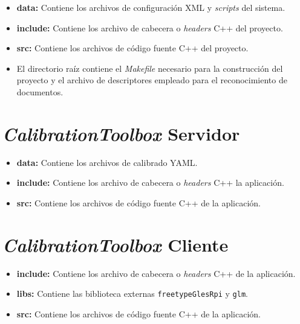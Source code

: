 \begin{itemize}
\item \textbf{data:} Contiene los archivos de configuración \acs{XML} y \textit{scripts} del sistema.
\item \textbf{include:} Contiene los archivo de cabecera o \textit{headers} C++ del proyecto.
\item \textbf{src:} Contiene los archivos de código fuente C++ del proyecto.
\item El directorio raíz contiene el \textit{Makefile} necesario para la construcción del proyecto y
  el archivo de descriptores empleado para el reconocimiento de documentos.
\end{itemize}

\section{\textit{CalibrationToolbox} Servidor}
\begin{itemize}
\item \textbf{data:} Contiene los archivos de calibrado YAML. 
\item \textbf{include:} Contiene los archivo de cabecera o \textit{headers} C++ la aplicación.
\item \textbf{src:} Contiene los archivos de código fuente C++ de la aplicación.
\end{itemize}

\section{\textit{CalibrationToolbox} Cliente}
\begin{itemize}
\item \textbf{include:} Contiene los archivo de cabecera o \textit{headers} C++ de la aplicación.
\item \textbf{libs:} Contiene las biblioteca externas \texttt{freetypeGlesRpi} y \texttt{glm}.
\item \textbf{src:} Contiene los archivos de código fuente C++ de la aplicación.
\end{itemize}


